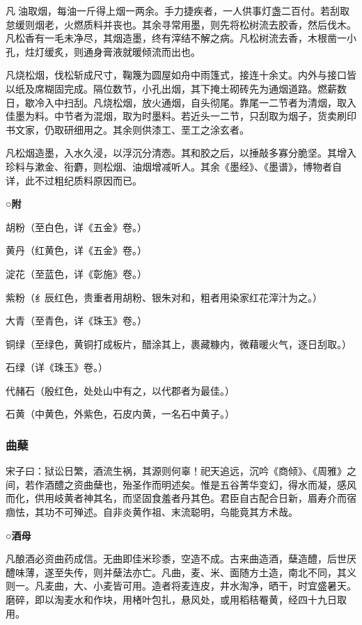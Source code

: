 \documentclass[]{article}
\begin{document}
凡油取烟，每油一斤得上烟一两余。手力捷疾者，一人供事灯盏二百付。若刮取怠缓则烟老，火燃质料并丧也。其余寻常用墨，则先将松树流去胶香，然后伐木。凡松香有一毛未净尽，其烟造墨，终有滓结不解之病。凡松树流去香，木根凿一小孔，炷灯缓炙，则通身膏液就暖倾流而出也。

凡烧松烟，伐松斩成尺寸，鞠篾为圆屋如舟中雨篷式，接连十余丈。内外与接口皆以纸及席糊固完成。隔位数节，小孔出烟，其下掩土砌砖先为通烟道路。燃薪数日，歇冷入中扫刮。凡烧松烟，放火通烟，自头彻尾。靠尾一二节者为清烟，取入佳墨为料。中节者为混烟，取为时墨料。若近头一二节，只刮取为烟子，货卖刷印书文家，仍取研细用之。其余则供漆工、垩工之涂玄者。

凡松烟造墨，入水久浸，以浮沉分清悫。其和胶之后，以捶敲多寡分脆坚。其增入珍料与漱金、衔麝，则松烟、油烟增减听人。其余《墨经》、《墨谱》，博物者自详，此不过粗纪质料原因而已。

\textbf{○附}

胡粉（至白色，详《五金》卷。）

黄丹（红黄色，详《五金》卷。）

淀花（至蓝色，详《彰施》卷。）

紫粉（纟辰红色，贵重者用胡粉、银朱对和，粗者用染家红花滓汁为之。）

大青（至青色，详《珠玉》卷。）

铜绿（至绿色，黄铜打成板片，醋涂其上，裹藏糠内，微藉暖火气，逐日刮取。）

石绿（详《珠玉》卷。）

代赭石（殷红色，处处山中有之，以代郡者为最佳。）

石黄（中黄色，外紫色，石皮内黄，一名石中黄子。）

\hypertarget{header-n2772}{%
\subsubsection{曲蘖}\label{header-n2772}}

宋子曰：狱讼日繁，酒流生祸，其源则何辜！祀天追远，沉吟《商倾》、《周雅》之间，若作酒醴之资曲蘖也，殆圣作而明述矣。惟是五谷菁华变幻，得水而凝，感风而化，供用岐黄者神其名，而坚固食羞者丹其色。君臣自古配合日新，眉寿介而宿痼怯，其功不可殚述。自非炎黄作祖、末流聪明，乌能竟其方术哉。

\textbf{○酒母}

凡酿酒必资曲药成信。无曲即佳米珍黍，空造不成。古来曲造酒，蘖造醴，后世厌醴味薄，遂至失传，则并蘖法亦亡。凡曲，麦、米、面随方土造，南北不同，其义则一。凡麦曲，大、小麦皆可用。造者将麦连皮，井水淘净，晒干，时宜盛暑天。磨碎，即以淘麦水和作块，用楮叶包扎，悬风处，或用稻秸罨黄，经四十九日取用。
\end{document}
